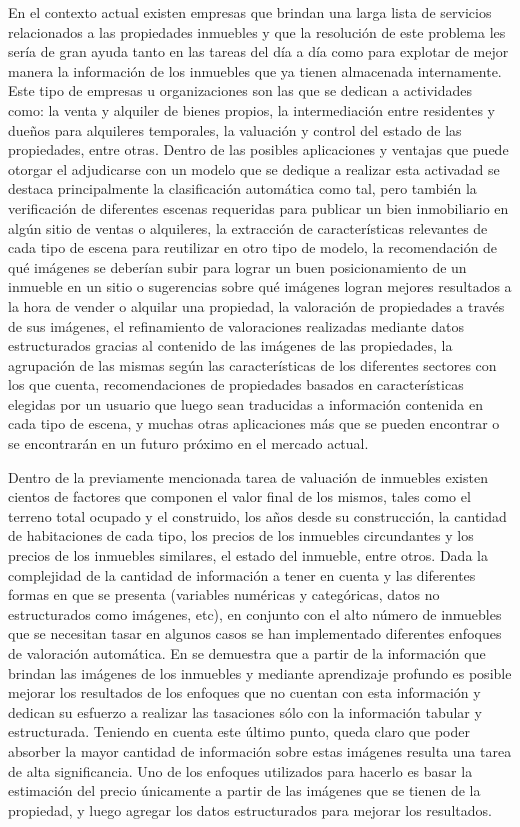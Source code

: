 En el contexto actual existen empresas que brindan una larga lista de servicios relacionados a las propiedades inmuebles y que la resolución de este problema les sería de gran ayuda tanto en las tareas del día a día como para explotar de mejor manera la información de los inmuebles que ya tienen almacenada internamente. Este tipo de empresas u organizaciones son las que se dedican a actividades como: la venta y alquiler de bienes propios, la intermediación entre residentes y dueños para alquileres temporales, la valuación y control del estado de las propiedades, entre otras.
Dentro de las posibles aplicaciones y ventajas que puede otorgar el adjudicarse con un modelo que se dedique a realizar esta activadad se destaca principalmente la clasificación automática como tal, pero también la verificación de diferentes escenas requeridas para publicar un bien inmobiliario en algún sitio de ventas o alquileres, la extracción de características relevantes de cada tipo de escena para reutilizar en otro tipo de modelo, la recomendación de qué imágenes se deberían subir para lograr un buen posicionamiento de un inmueble en un sitio o sugerencias sobre qué imágenes logran mejores resultados a la hora de vender o alquilar una propiedad, la valoración de propiedades a través de sus imágenes, el refinamiento de valoraciones realizadas mediante datos estructurados gracias al contenido de las imágenes de las propiedades, la agrupación de las mismas según las características de los diferentes sectores con los que cuenta, recomendaciones de propiedades basados en características elegidas por un usuario que luego sean traducidas a información contenida en cada tipo de escena, y muchas otras aplicaciones más que se pueden encontrar o se encontrarán en un futuro próximo en el mercado actual.

Dentro de la previamente mencionada tarea de valuación de inmuebles existen cientos de factores que componen el valor final de los mismos, tales como el terreno total ocupado y el construido, los años desde su construcción, la cantidad de habitaciones de cada tipo, los precios de los inmuebles circundantes y los precios de los inmuebles similares, el estado del inmueble, entre otros. Dada la complejidad de la cantidad de información a tener en cuenta y las diferentes formas en que se presenta (variables numéricas y categóricas, datos no estructurados como imágenes, etc), en conjunto con el alto número de inmuebles que se necesitan tasar en algunos casos se han implementado diferentes enfoques de valoración automática.
En \cite{vision_based_real_estate_price_estimation} se demuestra que a partir de la información que brindan las imágenes de los inmuebles y mediante aprendizaje profundo es posible mejorar los resultados de los enfoques que no cuentan con esta información y dedican su esfuerzo a realizar las tasaciones sólo con la información tabular y estructurada. 
Teniendo en cuenta este último punto, queda claro que poder absorber la mayor cantidad de información sobre estas imágenes resulta una tarea de alta significancia. Uno de los enfoques utilizados para hacerlo es basar la estimación del precio únicamente a partir de las imágenes que se tienen de la propiedad, y luego agregar los datos estructurados para mejorar los resultados.

